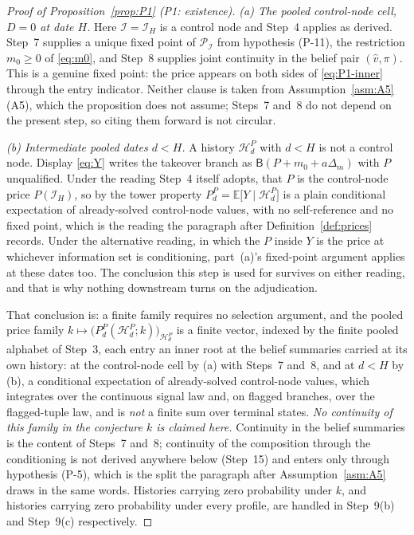 \documentclass[11pt]{article}
\newcommand{\Eop}{\mathbb{E}}
\begin{document}
\begin{proof}[Proof of Proposition~\ref{prop:P1} (P1: existence)]
\emph{(a) The pooled control-node cell, $D = 0$ at date $H$.} Here $\mathcal I = \mathcal I_H$ is a
control node and Step~4 applies as derived. Step~7 supplies a unique fixed point of
$\mathcal P_{\mathcal I}$ from hypothesis (P-11), the restriction $m_0 \ge 0$ of \eqref{eq:m0}, and
Step~8 supplies joint continuity in the belief pair $(\hat v,\pi)$. This is a genuine fixed point: the
price appears on both sides of \eqref{eq:P1-inner} through the entry indicator. Neither clause is
taken from Assumption~\ref{asm:A5} (A5), which the proposition does not assume; Steps~7 and~8 do not
depend on the present step, so citing them forward is not circular.

\emph{(b) Intermediate pooled dates $d < H$.} A history $\mathcal H_d^P$ with $d < H$ is not a
control node. Display \eqref{eq:Y} writes the takeover branch as $\mathsf B(P+m_0+a\Delta_m)$ with
$P$ unqualified. Under the reading Step~4 itself adopts, that $P$ is the control-node price
$P(\mathcal I_H)$, so by the tower property
$P_d^P = \Eop\bigl[Y \mid \mathcal H_d^P\bigr]$ is a plain conditional expectation of
already-solved control-node values, with no self-reference and no fixed point, which is the
reading the paragraph after Definition~\ref{def:prices} records. Under the alternative reading, in
which the $P$ inside $Y$ is the price at whichever information set is conditioning, part~(a)'s
fixed-point argument applies at these dates too. The conclusion this step is used for survives on
either reading, and that is why nothing downstream turns on the adjudication.

That conclusion is: a finite family requires no selection argument, and the pooled price family
$k \mapsto \bigl(P_d^P(\mathcal H_d^P;k)\bigr)_{\mathcal H_d^P}$ is a finite vector, indexed by the
finite pooled alphabet of Step~3, each entry an inner root at the belief summaries carried at its own
history: at the control-node cell by (a) with Steps~7 and~8, and at $d < H$ by (b), a conditional
expectation of already-solved control-node values, which integrates over the continuous signal law
and, on flagged branches, over the flagged-tuple law, and is \emph{not} a finite sum over terminal
states. \emph{No continuity of this family in the conjecture $k$ is claimed here.} Continuity in the
belief summaries is the content of Steps~7 and~8; continuity of the composition through the
conditioning is not derived anywhere below (Step~15) and enters only through hypothesis (P-5), which
is the split the paragraph after Assumption~\ref{asm:A5} draws in the same words. Histories carrying
zero probability under $k$, and histories carrying zero probability under every profile, are handled
in Step~9(b) and Step~9(c) respectively.


\end{proof}
\end{document}
